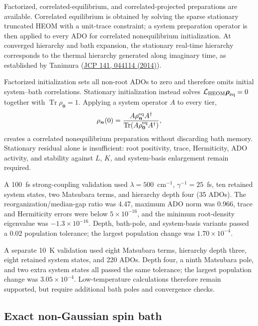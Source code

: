 \documentclass[11pt]{article}
\begin{document}
Factorized, correlated-equilibrium, and correlated-projected preparations are
available. Correlated equilibrium is obtained by solving the sparse stationary
truncated HEOM with a unit-trace constraint; a system preparation operator is then
applied to every ADO for correlated nonequilibrium initialization. At converged
hierarchy and bath expansion, the stationary real-time hierarchy corresponds to the
thermal hierarchy generated along imaginary time, as established by Tanimura
(\href{https://doi.org/10.1063/1.4890441}{JCP 141, 044114 (2014)}).

Factorized initialization sets all non-root ADOs to zero and therefore omits initial
system--bath correlations. Stationary initialization instead solves
$\mathcal L_{\rm HEOM}\boldsymbol\rho_{\rm eq}=0$ together with
$\operatorname{Tr}\rho_{\boldsymbol 0}=1$. Applying a system operator $A$ to every
tier,
\begin{equation}
 \rho_{\boldsymbol n}(0)=
 \frac{A\rho^{\rm eq}_{\boldsymbol n}A^\dagger}
 {\operatorname{Tr}(A\rho^{\rm eq}_{\boldsymbol 0}A^\dagger)},
\end{equation}
creates a correlated nonequilibrium preparation without discarding bath memory.
Stationary residual alone is insufficient: root positivity, trace, Hermiticity, ADO
activity, and stability against $L$, $K$, and system-basis enlargement remain
required.

A 100~fs strong-coupling validation used $\lambda=500$~cm$^{-1}$,
$\gamma^{-1}=25$~fs, ten retained system states, two Matsubara terms, and
hierarchy depth four (35 ADOs). The reorganization/median-gap ratio was 4.47,
maximum ADO norm was 0.966, trace and Hermiticity errors were below
$5\times10^{-16}$, and the minimum root-density eigenvalue was
$-1.3\times10^{-16}$. Depth, bath-pole, and system-basis variants passed a
0.02 population tolerance; the largest population change was
$1.70\times10^{-4}$.

A separate 10~K validation used eight Matsubara terms, hierarchy depth three,
eight retained system states, and 220 ADOs. Depth four, a ninth Matsubara pole,
and two extra system states all passed the same tolerance; the largest population
change was $3.05\times10^{-4}$. Low-temperature calculations therefore remain
supported, but require additional bath poles and convergence checks.

\subsection{Exact non-Gaussian spin bath}
\end{document}
